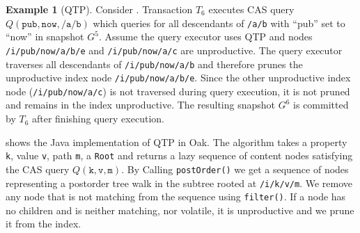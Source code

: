\documentclass[abstracton,12pt]{scrartcl}
\theoremstyle{definition}
\newtheorem{example}{Example}
\begin{document}
\begin{example}[QTP]
  Consider . Transaction $T_6$ executes CAS query
  $Q(\texttt{pub},\texttt{now},\texttt{/a/b})$ which queries for all descendants
  of \texttt{/a/b} with ``pub'' set to ``now'' in snapshot $G^5$. Assume the
  query executor uses QTP and nodes \texttt{/i/pub/now/a/b/e} and
  \texttt{/i/pub/now/a/c} are unproductive. The
  query executor traverses all descendants of \texttt{/i/pub/now/a/b} and
  therefore prunes the unproductive index node \texttt{/i/pub/now/a/b/e}. Since
  the other unproductive index node (\texttt{/i/pub/now/a/c}) is not traversed
  during query execution,
  it is not pruned and remains in the index unproductive. The resulting
  snapshot $G^6$ is committed by $T_6$ after finishing query execution.
\end{example}


 shows the Java implementation of QTP in Oak. The algorithm
takes a property \texttt{k}, value \texttt{v}, path \texttt{m}, a
\texttt{Root} and returns a lazy sequence of content nodes satisfying
the CAS query $Q(\texttt{k},\texttt{v},\texttt{m})$. By Calling
\texttt{postOrder()} we get a sequence of nodes representing a
postorder tree walk in the subtree rooted at \texttt{/i/k/v/m}. We remove any
node that is not
matching from the sequence using \texttt{filter()}. If a node has no children
and is neither matching,
nor volatile, it is unproductive and we prune it from the index.

\vspace{1cm}
\end{document}
